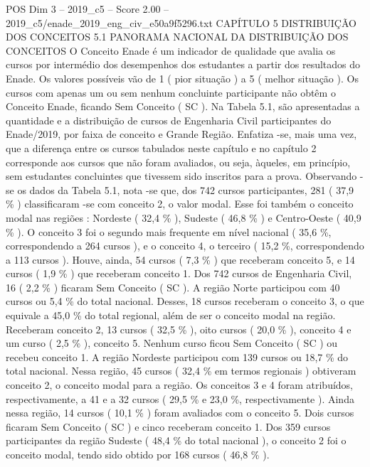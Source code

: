 \begin{textsample}{POS Dim 3 – 2019\_c5 – Score 2.00 – 2019\_c5/enade\_2019\_eng\_civ\_e50a9f5296.txt}  \label{ex:f3_pos_080}
CAPÍTULO 5 DISTRIBUIÇÃO DOS CONCEITOS 5.1 PANORAMA NACIONAL DA DISTRIBUIÇÃO DOS CONCEITOS O Conceito Enade é um indicador de qualidade que avalia os cursos por intermédio dos desempenhos dos estudantes a partir dos resultados do Enade.
Os valores possíveis vão de 1 ( pior situação ) a 5 ( melhor situação ).
Os cursos com apenas um ou sem nenhum concluinte participante não obtêm o Conceito Enade, ficando Sem Conceito ( SC ).
Na Tabela 5.1, são apresentadas a quantidade e a distribuição de cursos de Engenharia Civil participantes do Enade/2019, por faixa de conceito e Grande Região.
Enfatiza -se, mais uma vez, que a diferença entre os cursos tabulados neste capítulo e no capítulo 2 corresponde aos cursos que não foram avaliados, ou seja, àqueles, em princípio, sem estudantes concluintes que tivessem sido inscritos para a prova.
Observando -se os dados da Tabela 5.1, nota -se que, dos 742 cursos participantes, 281 ( 37,9 \% ) classificaram -se com conceito 2, o valor modal.
Esse foi também o conceito modal nas regiões : Nordeste ( 32,4 \% ), Sudeste ( 46,8 \% ) e Centro-Oeste ( 40,9 \% ).
O conceito 3 foi o segundo mais frequente em nível nacional ( 35,6 \%, correspondendo a 264 cursos ), e o conceito 4, o terceiro ( 15,2 \%, correspondendo a 113 cursos ).
Houve, ainda, 54 cursos ( 7,3 \% ) que receberam conceito 5, e 14 cursos ( 1,9 \% ) que receberam conceito 1.
Dos 742 cursos de Engenharia Civil, 16 ( 2,2 \% ) ficaram Sem Conceito ( SC ).
A região Norte participou com 40 cursos ou 5,4 \% do total nacional.
Desses, 18 cursos receberam o conceito 3, o que equivale a 45,0 \% do total regional, além de ser o conceito modal na região.
Receberam conceito 2, 13 cursos ( 32,5 \% ), oito cursos ( 20,0 \% ), conceito 4 e um curso ( 2,5 \% ), conceito 5.
Nenhum curso ficou Sem Conceito ( SC ) ou recebeu conceito 1.
A região Nordeste participou com 139 cursos ou 18,7 \% do total nacional.
Nessa região, 45 cursos ( 32,4 \% em termos regionais ) obtiveram conceito 2, o conceito modal para a região.
Os conceitos 3 e 4 foram atribuídos, respectivamente, a 41 e a 32 cursos ( 29,5 \% e 23,0 \%, respectivamente ).
Ainda nessa região, 14 cursos ( 10,1 \% ) foram avaliados com o conceito 5.
Dois cursos ficaram Sem Conceito ( SC ) e cinco receberam conceito 1.
Dos 359 cursos participantes da região Sudeste ( 48,4 \% do total nacional ), o conceito 2 foi o conceito modal, tendo sido obtido por 168 cursos ( 46,8 \% ).

\end{textsample}
